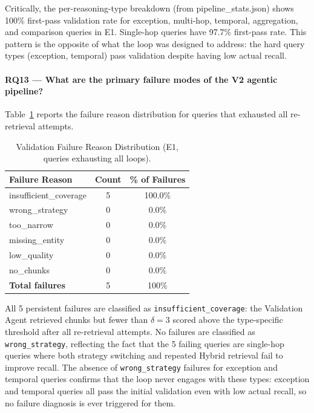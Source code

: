 Critically, the per-reasoning-type breakdown (from pipeline\_stats.json) shows 100\% first-pass validation rate for exception, multi-hop, temporal, aggregation, and comparison queries in E1. Single-hop queries have 97.7\% first-pass rate. This pattern is the opposite of what the loop was designed to address: the hard query types (exception, temporal) pass validation despite having low actual recall.

\paragraph{RQ13 --- What are the primary failure modes of the V2 agentic pipeline?}

Table~\ref{tab:v2_failure_modes} reports the failure reason distribution for queries that exhausted all re-retrieval attempts.

\begin{table}[htbp]
\centering
\caption{Validation Failure Reason Distribution (E1, queries exhausting all loops).}
\label{tab:v2_failure_modes}
\begin{tabular}{lcc}
\toprule
\textbf{Failure Reason} & \textbf{Count} & \textbf{\% of Failures} \\
\midrule
insufficient\_coverage & 5 & 100.0\% \\
wrong\_strategy        & 0 & 0.0\% \\
too\_narrow            & 0 & 0.0\% \\
missing\_entity        & 0 & 0.0\% \\
low\_quality           & 0 & 0.0\% \\
no\_chunks             & 0 & 0.0\% \\
\midrule
\textbf{Total failures} & 5 & 100\% \\
\bottomrule
\end{tabular}
\end{table}

All 5 persistent failures are classified as \texttt{insufficient\_coverage}: the Validation Agent retrieved chunks but fewer than $\delta{=}3$ scored above the type-specific threshold after all re-retrieval attempts. No failures are classified as \texttt{wrong\_strategy}, reflecting the fact that the 5 failing queries are single-hop queries where both strategy switching and repeated Hybrid retrieval fail to improve recall. The absence of \texttt{wrong\_strategy} failures for exception and temporal queries confirms that the loop never engages with these types: exception and temporal queries all pass the initial validation even with low actual recall, so no failure diagnosis is ever triggered for them.

